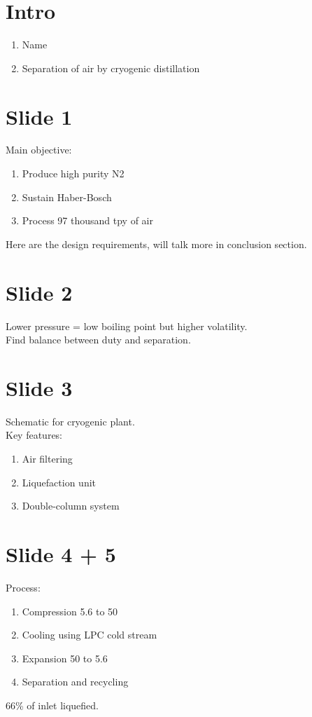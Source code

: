 \documentclass[11pt,oneside]{article}
\begin{document}
\singlespacing
\setlength{\parindent}{0pt}
\section{Intro}
    \begin{enumerate}
        \item Name
        \item Separation of air by cryogenic distillation
    \end{enumerate}

\section{Slide 1}
    Main objective:
    \begin{enumerate}
        \item Produce high purity N2
        \item Sustain Haber-Bosch
        \item Process 97 thousand tpy of air
    \end{enumerate}
    Here are the design requirements, will talk more in conclusion section.

\section{Slide 2}
    Lower pressure = low boiling point but higher volatility. \\
    Find balance between duty and separation.

\section{Slide 3}
    Schematic for cryogenic plant. \\
    Key features:
    \begin{enumerate}
        \item Air filtering
        \item Liquefaction unit
        \item Double-column system
    \end{enumerate}

\section{Slide 4 + 5}
    Process:
    \begin{enumerate}
        \item Compression 5.6 to 50
        \item Cooling using LPC cold stream
        \item Expansion 50 to 5.6
        \item Separation and recycling
    \end{enumerate}
    66\% of inlet liquefied.
    
\end{document}
